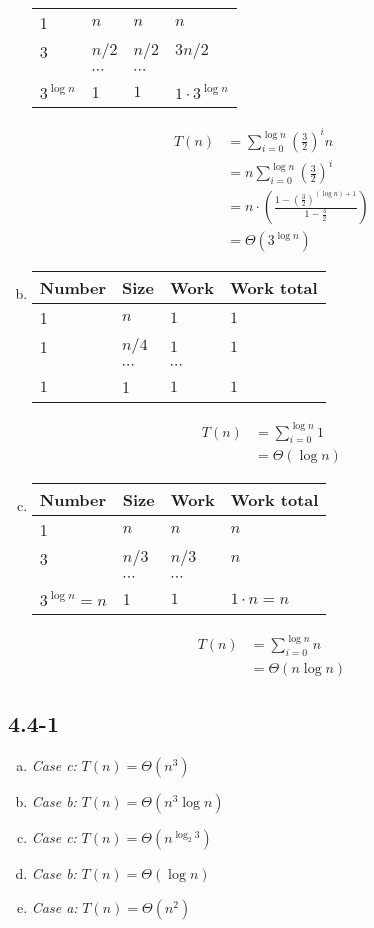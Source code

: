 \documentclass[twocolumn]{article}
\begin{document}
\begin{enumerate}[a.]
\begin{table}[H]
\begin{tabular}{ll|ll}
				1&$n$&$n$&$n$\\ 
				3&$n/2$&$n/2$&$3n/2$\\
				&$\cdots$&$\cdots$&\\
				$3^{\log n}$&1&$1$&$1\cdot 3^{\log n}$
			\end{tabular}
		\end{table}
		\[
		\begin{aligned}
		T(n)&=\sum_{i=0}^{\log n}\left(\frac{3}{2}\right)^in\\
		&=n\sum_{i=0}^{\log n}\left(\frac{3}{2}\right)^i\\
		&=n\cdot\left(\frac{1-\left(\frac{3}{2}\right)^{(\log n)+1}}{1-\frac{3}{2}}\right)\\
		&=\Theta(3^{\log n})
		\end{aligned}
		\]
		\item 
			\begin{table}[H]
			\begin{tabular}{ll|ll}
				\textbf{Number}&\textbf{Size}&\textbf{Work}&\textbf{Work total}\\ \hline
				1&$n$&$1$&$1$\\ 
				1&$n/4$&$1$&$1$\\
				&$\cdots$&$\cdots$&\\
				$1$&1&$1$&$1$
			\end{tabular}
		\end{table}
		\[
		\begin{aligned}
		T(n)&=\sum_{i=0}^{\log n}1\\
		&=\Theta(\log n)
		\end{aligned}
		\]
		\item 
		\begin{table}[H]
			\begin{tabular}{ll|ll}
				\textbf{Number}&\textbf{Size}&\textbf{Work}&\textbf{Work total}\\ \hline
				1&$n$&$n$&$n$\\ 
				3&$n/3$&$n/3$&$n$\\
				&$\cdots$&$\cdots$&\\
				$3^{\log n}=n$&1&$1$&$1\cdot n=n$
			\end{tabular}
		\end{table}
		\[
		\begin{aligned}
		T(n)&=\sum_{i=0}^{\log n}n\\
		&=\Theta(n\log n)
		\end{aligned}
		\]
	\end{enumerate}
	\subsection*{4.4-1}
	\begin{enumerate}[a.]
		\item \emph{Case c: }$T(n)=\Theta(n^3)$
		\item \emph{Case b: }$T(n)=\Theta(n^3\log n)$
		\item \emph{Case c: }$T(n)=\Theta(n^{\log_2 3})$ 
		\item \emph{Case b: }$T(n)=\Theta(\log n)$
		\item \emph{Case a: }$T(n)=\Theta(n^2)$
	\end{enumerate}
\end{document}

